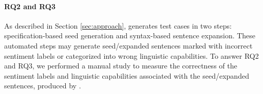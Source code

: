 %
%

\paragraph*{\textbf{RQ2 and RQ3}} As described in Section \ref{sec:approach},
\tool generates test cases in two steps: specification-based seed
generation and syntax-based sentence expansion. These automated steps
may generate seed/expanded sentences marked with incorrect sentiment
labels or categorized into wrong linguistic capabilities.
To answer RQ2 and RQ3, we performed a manual study to
measure the correctness of the sentiment labels and linguistic
capabilities associated with the seed/expanded sentences, produced by
\tool.

